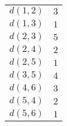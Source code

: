 \begin{tabular}{r@{=}l}
	$ d \left( 1, 2 \right) $ & $ 3 $ \\
	$ d \left( 1, 3 \right) $ & $ 1 $ \\
	$ d \left( 2, 3 \right) $ & $ 5 $ \\
	$ d \left( 2, 4 \right) $ & $ 2 $ \\
	$ d \left( 2, 5 \right) $ & $ 1 $ \\
	$ d \left( 3, 5 \right) $ & $ 4 $ \\
	$ d \left( 4, 6 \right) $ & $ 3 $ \\
	$ d \left( 5, 4 \right) $ & $ 2 $ \\
	$ d \left( 5, 6 \right) $ & $ 1 $ \\
\end{tabular}